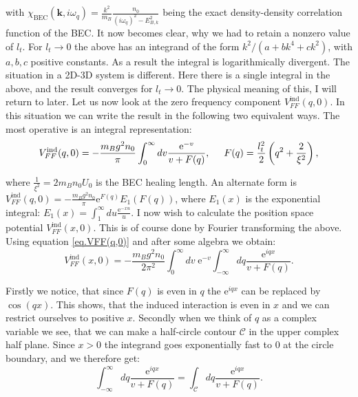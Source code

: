 with $\chi_\text{BEC}(\mathbf{k},i\omega_q) = \frac{k^2}{m_B}\frac{n_0}{(i\omega_q)^2-E_{B,k}^2}$ being the exact density-density correlation function of the BEC. It now becomes clear, why we had to retain a nonzero value of $l_t$. For $l_t\to 0$ the above has an integrand of the form $k^2/(a+bk^4+ck^2)$, with $a,b,c$ positive constants. As a result the integral is logarithmically divergent. The situation in a 2D-3D system is different. Here there is a single integral in the above, and the result converges for $l_t\to 0$. The physical meaning of this, I will return to later. Let us now look at the zero frequency component $V_{FF}^\text{ind}(q,0)$. In this situation we can write the result in the following two equivalent ways. The most operative is an integral representation:
\begin{equation}
V_{FF}^\text{ind}(q,0) = -\frac{m_Bg^2n_0}{\pi}\int_{0}^\infty dv \frac{\text{e}^{-v}}{v+F(q)}, \hspace{0.5cm} F(q) = \frac{l_t^2}{2}\left(q^2+\frac{2}{\xi^2} \right),
\label{eq.VFF(q,0)}
\end{equation}

where $\frac{1}{\xi^2} = 2m_Bn_0U_0$ is the BEC healing length. An alternate form is $V_{FF}^\text{ind}(q,0) = -\frac{m_Bg^2n_0}{\pi} \text{e}^{F(q)} E_1(F(q))$, where $E_1(x)$ is the exponential integral: $E_1(x) = \int_1^\infty du \frac{\text{e}^{-xu}}{u}$. I now wish to calculate the position space potential $V_{FF}^\text{ind}(x,0)$. This is of course done by Fourier transforming the above. Using equation \eqref{eq.VFF(q,0)} and after some algebra we obtain:
\begin{equation}
V_{FF}^\text{ind}(x,0) = -\frac{m_Bg^2n_0}{2\pi^2}\int_0^\infty dv\;  \text{e}^{-v}\int_{-\infty}^\infty dq \frac{\text{e}^{iqx}}{v+F(q)}.
\end{equation}

Firstly we notice, that since $F(q)$ is even in $q$ the $\text{e}^{iqx}$ can be replaced by $\cos(qx)$. This shows, that the induced interaction is even in $x$ and we can restrict ourselves to positive $x$. Secondly when we think of $q$ as a complex variable we see, that  we can make a half-circle contour $\mathcal{C}$ in the upper complex half plane. Since $x>0$ the integrand goes exponentially fast to 0 at the circle boundary, and we therefore get:
\begin{equation}
\int_{-\infty}^\infty dq \frac{\text{e}^{iqx}}{v+F(q)} = \int_\mathcal{C} dq  \frac{\text{e}^{iqx}}{v+F(q)}. \nonumber
\end{equation}

